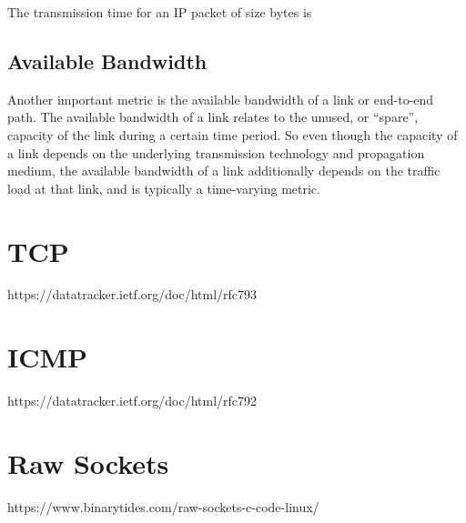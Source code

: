
The transmission time for an IP packet of size bytes is

\subsection*{Available Bandwidth}
Another important metric is the available bandwidth of a link or end-to-end path. The available bandwidth of a link relates to the unused, or “spare”, capacity of the link during a certain time period. So even though the capacity of a link depends on the underlying transmission technology and propagation medium, the available bandwidth of a link additionally depends on the traffic load at that link, and is typically a time-varying metric.

\section{TCP}
https://datatracker.ietf.org/doc/html/rfc793

\section{ICMP}
https://datatracker.ietf.org/doc/html/rfc792

\section{Raw Sockets}
https://www.binarytides.com/raw-sockets-c-code-linux/


